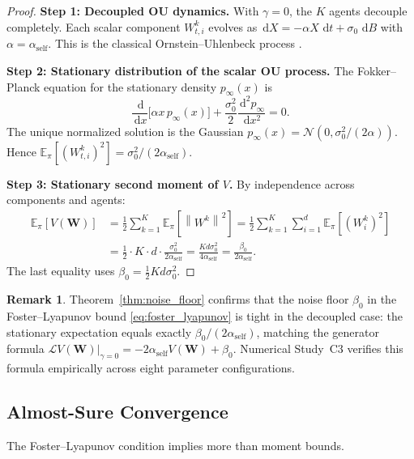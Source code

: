 \documentclass[12pt]{article}
\theoremstyle{plain}
\theoremstyle{definition}
\newtheorem{remark}[theorem]{Remark}
\newcommand{\E}{\mathbb{E}}
\newcommand{\Lgen}{\mathcal{L}}
\newcommand{\W}{\mathbf{W}}
\newcommand{\norm}[1]{\left\lVert #1 \right\rVert}
\newcommand{\dif}{\,\mathrm{d}}
\begin{document}
\begin{proof}
  \textbf{Step 1: Decoupled OU dynamics.}
  With $\gamma = 0$, the $K$ agents decouple completely.  Each scalar
  component $W^k_{t,i}$ evolves as
  $\dif X = -\alpha X\,\dif t + \sigma_0\,\dif B$ with
  $\alpha = \alpha_{\mathrm{self}}$.  This is the classical
  Ornstein--Uhlenbeck process \cite{uhlenbeck1930theory}.

  \textbf{Step 2: Stationary distribution of the scalar OU process.}
  The Fokker--Planck equation for the stationary density $p_\infty(x)$ is
  \[
    \frac{\dif}{\dif x}\bigl[\alpha x\, p_\infty(x)\bigr]
    + \frac{\sigma_0^2}{2} \frac{\dif^2 p_\infty}{\dif x^2} = 0.
  \]
  The unique normalized solution is the Gaussian
  $p_\infty(x) = \mathcal{N}(0, \sigma_0^2/(2\alpha))$.
  Hence $\E_\pi[(W^k_{t,i})^2] = \sigma_0^2/(2\alpha_{\mathrm{self}})$.

  \textbf{Step 3: Stationary second moment of $V$.}
  By independence across components and agents:
  \begin{align*}
    \E_\pi[V(\W)]
    &= \frac{1}{2} \sum_{k=1}^K \E_\pi\!\left[\norm{W^k}^2\right]
     = \frac{1}{2} \sum_{k=1}^K \sum_{i=1}^d
       \E_\pi\!\left[(W^k_i)^2\right] \\
    &= \frac{1}{2} \cdot K \cdot d \cdot \frac{\sigma_0^2}{2\alpha_{\mathrm{self}}}
     = \frac{Kd\sigma_0^2}{4\alpha_{\mathrm{self}}}
     = \frac{\beta_0}{2\alpha_{\mathrm{self}}}.
  \end{align*}
  The last equality uses $\beta_0 = \tfrac{1}{2}Kd\sigma_0^2$.
\end{proof}

\begin{remark}
  Theorem~\ref{thm:noise_floor} confirms that the noise floor
  $\beta_0$ in the Foster--Lyapunov bound \eqref{eq:foster_lyapunov}
  is tight in the decoupled case: the stationary expectation
  equals exactly $\beta_0 / (2\alpha_{\mathrm{self}})$, matching the
  generator formula $\Lgen V(\W)\big|_{\gamma=0} = -2\alpha_{\mathrm{self}}
  V(\W) + \beta_0$.  Numerical Study~C3 verifies this formula
  empirically across eight parameter configurations.
\end{remark}

\subsection{Almost-Sure Convergence}

The Foster--Lyapunov condition implies more than moment bounds.
\end{document}

